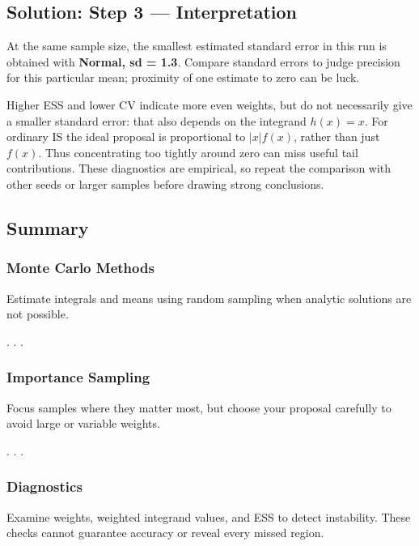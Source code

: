 \documentclass[
  letterpaper,
  DIV=11,
  numbers=noendperiod]{scrartcl}
\begin{document}
\subsection{Solution: Step 3 ---
Interpretation}\label{solution-step-3-interpretation}

At the same sample size, the smallest estimated standard error in this
run is obtained with \textbf{Normal, sd = 1.3}. Compare standard errors
to judge precision for this particular mean; proximity of one estimate
to zero can be luck.

Higher ESS and lower CV indicate more even weights, but do not
necessarily give a smaller standard error: that also depends on the
integrand \(h(x)=x\). For ordinary IS the ideal proposal is proportional
to \(|x|f(x)\), rather than just \(f(x)\). Thus concentrating too
tightly around zero can miss useful tail contributions. These
diagnostics are empirical, so repeat the comparison with other seeds or
larger samples before drawing strong conclusions.

\subsection{Summary}\label{summary}

\subsubsection{Monte Carlo Methods}\label{monte-carlo-methods-2}

Estimate integrals and means using random sampling when analytic
solutions are not possible.

. . .

\subsubsection{Importance Sampling}\label{importance-sampling-2}

Focus samples where they matter most, but choose your proposal carefully
to avoid large or variable weights.

. . .

\subsubsection{Diagnostics}\label{diagnostics}

Examine weights, weighted integrand values, and ESS to detect
instability. These checks cannot guarantee accuracy or reveal every
missed region.
\end{document}
